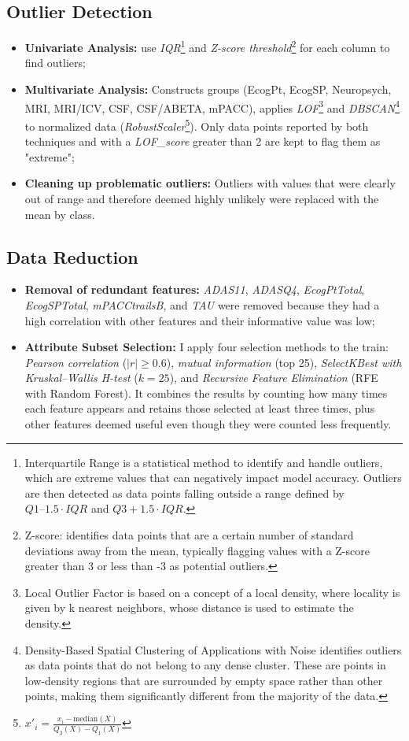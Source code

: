 \subsection{Outlier Detection}
\begin{itemize}
	\item \textbf{Univariate Analysis:} use \textit{IQR}\footnote{Interquartile Range is a statistical method to identify and handle outliers, which are extreme values that can negatively impact model accuracy. Outliers are then detected as data points falling outside a range defined by $Q1 – 1.5 \cdot IQR$ and $Q3 + 1.5 \cdot IQR$.} and \textit{Z-score threshold}\footnote{Z-score: identifies data points that are a certain number of standard deviations away from the mean, typically flagging values with a Z-score greater than 3 or less than -3 as potential outliers.} for each column to find outliers;
	\item \textbf{Multivariate Analysis:} Constructs groups (EcogPt, EcogSP, Neuropsych, MRI, MRI/ICV, CSF, CSF/ABETA, mPACC), applies \textit{LOF}\footnote{Local Outlier Factor is based on a concept of a local density, where locality is given by k nearest neighbors, whose distance is used to estimate the density.} and \textit{DBSCAN}\footnote{Density-Based Spatial Clustering of Applications with Noise identifies outliers as data points that do not belong to any dense cluster. These are points in low-density regions that are surrounded by empty space rather than other points, making them significantly different from the majority of the data.} to normalized data (\textit{RobustScaler}\footnote{$x'_i = \frac{x_i - \text{median}(X)}{Q_3(X)-Q_1(X)}$}). Only data points reported by both techniques and with a \textit{LOF\_score} greater than 2 are kept to flag them as "extreme";
	\item \textbf{Cleaning up problematic outliers:} Outliers with values that were clearly out of range and therefore deemed highly unlikely were replaced with the mean by class.
\end{itemize}

\columnbreak

\subsection{Data Reduction}
\begin{itemize}
	\item \textbf{Removal of redundant features:} \textit{ADAS11}, \textit{ADASQ4}, \textit{EcogPtTotal}, \textit{EcogSPTotal}, \textit{mPACCtrailsB}, and \textit{TAU} were removed because they had a high correlation with other features and their informative value was low;
	\item \textbf{Attribute Subset Selection:} I apply four selection methods to the train: \textit{Pearson correlation} ($|r| \ge 0.6$), \textit{mutual information} (top 25), \textit{SelectKBest with Kruskal–Wallis H-test} ($k=25$), and \textit{Recursive Feature Elimination} (RFE with Random Forest). It combines the results by counting how many times each feature appears and retains those selected at least three times, plus other features deemed useful even though they were counted less frequently.
\end{itemize}

